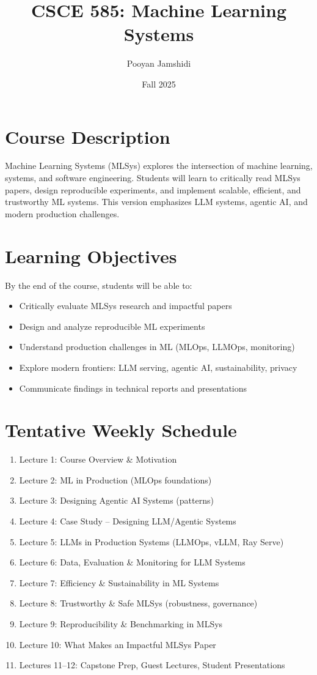 \documentclass[11pt]{article}
\title{CSCE 585: Machine Learning Systems}
\author{Pooyan Jamshidi}
\date{Fall 2025}
\begin{document}
\maketitle

\section*{Course Description}
Machine Learning Systems (MLSys) explores the intersection of machine learning, systems, and software engineering. 
Students will learn to critically read MLSys papers, design reproducible experiments, and implement scalable, efficient, 
and trustworthy ML systems. This version emphasizes LLM systems, agentic AI, and modern production challenges.

\section*{Learning Objectives}
By the end of the course, students will be able to:
\begin{itemize}[leftmargin=*]
    \item Critically evaluate MLSys research and impactful papers
    \item Design and analyze reproducible ML experiments
    \item Understand production challenges in ML (MLOps, LLMOps, monitoring)
    \item Explore modern frontiers: LLM serving, agentic AI, sustainability, privacy
    \item Communicate findings in technical reports and presentations
\end{itemize}

\section*{Tentative Weekly Schedule}
\begin{enumerate}[leftmargin=*]
    \item Lecture 1: Course Overview \& Motivation
    \item Lecture 2: ML in Production (MLOps foundations)
    \item Lecture 3: Designing Agentic AI Systems (patterns)
    \item Lecture 4: Case Study -- Designing LLM/Agentic Systems
    \item Lecture 5: LLMs in Production Systems (LLMOps, vLLM, Ray Serve)
    \item Lecture 6: Data, Evaluation \& Monitoring for LLM Systems
    \item Lecture 7: Efficiency \& Sustainability in ML Systems
    \item Lecture 8: Trustworthy \& Safe MLSys (robustness, governance)
    \item Lecture 9: Reproducibility \& Benchmarking in MLSys
    \item Lecture 10: What Makes an Impactful MLSys Paper
    \item Lectures 11--12: Capstone Prep, Guest Lectures, Student Presentations
\end{enumerate}
\end{document}
